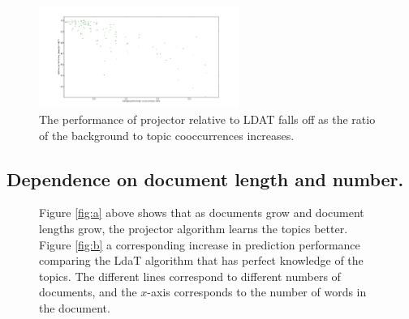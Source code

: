 \begin{figure}[t]
                  \includegraphics[width=0.58\textwidth]{projldaT-ratio.pdf}
    \caption{The performance of projector relative to LDAT falls off as the ratio of the background
to topic cooccurrences increases.
}
   \label{fig:ratio}
\end{figure}



\subsection{Dependence on document length and number.}


\begin{figure}
     \begin{center}



    \end{center}
    \caption{Figure \ref{fig:a} above shows that as documents grow and document lengths grow, the projector algorithm
learns the topics better.  Figure \ref{fig:b} a corresponding increase in prediction performance comparing the LdaT algorithm that has perfect knowledge of the topics.  The different lines correspond to different numbers of documents, and the $x$-axis corresponds to the number of words in the document.}
   \label{fig:size-matters}
\end{figure}


